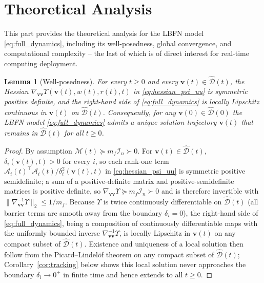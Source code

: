 \documentclass[pdflatex,sn-mathphys,Numbered]{sn-jnl}
\theoremstyle{thmstyleone}
\newtheorem{lemma}[theorem]{Lemma}
\theoremstyle{thmstyletwo}
\theoremstyle{thmstylethree}
\begin{document}
\section{Theoretical Analysis}\label{sec3}
This part provides the theoretical analysis for the LBFN model \eqref{eq:full_dynamics}, including its well-posedness, global convergence, and computational complexity -- the last of which is of direct interest for real-time computing deployment.

\begin{lemma}[Well-posedness]\label{lem:wellposed}
For every $t\geq0$ and every $\bm{v}(t)\in\widehat{\mathcal{D}}(t)$, the Hessian $\nabla_{\bm{vv}}\Upsilon(\bm{v}(t),w(t),r(t),t)$ in \eqref{eq:hessian_psi_uu} is symmetric positive definite, and the right-hand side of \eqref{eq:full_dynamics} is locally Lipschitz continuous in $\bm{v}(t)$ on $\widehat{\mathcal{D}}(t)$. Consequently, for any $\bm{v}(0)\in\widehat{\mathcal{D}}(0)$ the LBFN model \eqref{eq:full_dynamics} admits a unique solution trajectory $\bm{v}(t)$ that remains in $\widehat{\mathcal{D}}(t)$ for all $t\geq0$.
\end{lemma}
\begin{proof}
By assumption $\mathcal{M}(t)\succeq m_f\mathcal{I}_n\succ0$. For $\bm{v}(t)\in\widehat{\mathcal{D}}(t)$, $\delta_i(\bm{v}(t),t)>0$ for every $i$, so each rank-one term $\mathcal{A}_i(t)^\top\mathcal{A}_i(t)/\delta_i^2(\bm{v}(t),t)$ in \eqref{eq:hessian_psi_uu} is symmetric positive semidefinite; a sum of a positive-definite matrix and positive-semidefinite matrices is positive definite, so $\nabla_{\bm{vv}}\Upsilon\succeq m_f\mathcal{I}_n\succ0$ and is therefore invertible with $\|\nabla_{\bm{vv}}^{-1}\Upsilon\|_2\leq1/m_f$. Because $\Upsilon$ is twice continuously differentiable on $\widehat{\mathcal{D}}(t)$ (all barrier terms are smooth away from the boundary $\delta_i=0$), the right-hand side of \eqref{eq:full_dynamics}, being a composition of continuously differentiable maps with the uniformly bounded inverse $\nabla_{\bm{vv}}^{-1}\Upsilon$, is locally Lipschitz in $\bm{v}(t)$ on any compact subset of $\widehat{\mathcal{D}}(t)$. Existence and uniqueness of a local solution then follow from the Picard--Lindel\"of theorem on any compact subset of $\widehat{\mathcal{D}}(t)$; Corollary~\ref{cor:tracking} below shows this local solution never approaches the boundary $\delta_i\to0^+$ in finite time and hence extends to all $t\geq0$.
\end{proof}
\end{document}

